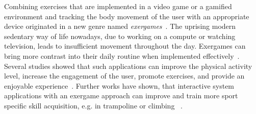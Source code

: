 Combining exercises that are implemented in a video game or a gamified environment and tracking the body movement of the user with an appropriate device originated in a new genre named \textit{exergames}~\cite{Buddharaju2016-ex, Sinclair2007-ex}.
The uprising modern sedentary way of life nowadays, due to working on a compute or watching television, leads to insufficient movement throughout the day.
Exergames can bring more contrast into their daily routine when implemented effectively~\cite{Rudella2012-ex}.
Several studies showed that such applications can improve the physical activity level, increase the engagement of the user, promote exercises, and provide an enjoyable experience~\cite{Graf2009-ex, Hicks2010-ex, Thin2010-ex}.
Further works have shown, that interactive system applications with an exergame approach can improve and train more sport specific skill acquisition, e.g. in trampoline or climbing ~\cite{Bogdanovych2015-ci, Medeiros2017-ex, Holsti2013-kn, Jensen2014-ex, Kajastila2016-ot}.

